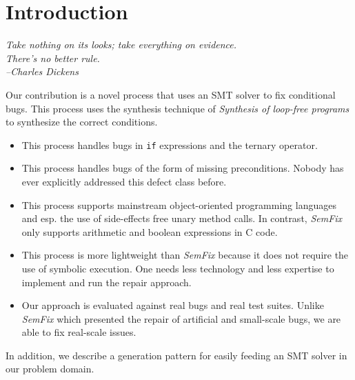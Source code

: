 \chapter{Introduction}
{\begin{small}%
\begin{flushright}%
\it
Take nothing on its looks; take everything on evidence. \\ There's no better rule. \\
--Charles Dickens
\end{flushright}%
\end{small}%
\vspace{.5cm}}

Our contribution is a novel process that uses an SMT solver to fix conditional bugs.
 This process uses the synthesis technique of \textit{Synthesis of loop-free programs}\cite{Gulwani:2011:SLP:1993316.1993506} to synthesize the correct conditions.
\begin{itemize}
 \item This process handles bugs in \texttt{if} expressions and the ternary operator.
 \item This process handles bugs of the form of missing preconditions. Nobody has ever explicitly addressed this defect class before.
 \item This process supports mainstream object-oriented programming languages and esp. the use of side-effects free unary method calls. In contrast, \textit{SemFix}\cite{Nguyen:2013:SPR:2486788.2486890} only supports arithmetic and boolean expressions in C code.
 \item This process is more lightweight than \textit{SemFix}\cite{Nguyen:2013:SPR:2486788.2486890} because it does not require the use of symbolic execution. One needs less technology and less expertise to implement and run the repair approach.
 \item Our approach is evaluated against real bugs and real test suites. Unlike \textit{SemFix}\cite{Nguyen:2013:SPR:2486788.2486890} which presented the repair of artificial and small-scale bugs, we are able to fix real-scale issues.
\end{itemize}

In addition, we describe a generation pattern for easily feeding an SMT solver in our problem domain.
